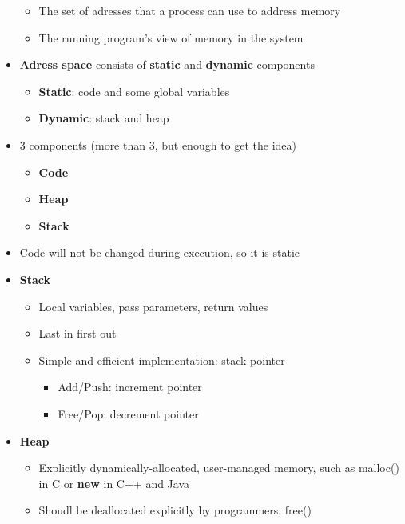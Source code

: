 \documentclass[a4paper,11pt,english]{article}
\begin{document}
\begin{itemize}
\begin{itemize}
            \item The set of adresses that a process can use to address memory
            \item The running program's view of memory in the system
        \end{itemize}
    \item \textbf{\color{blue} Adress space} consists of \textbf{\color{blue} static} and \textbf{\color{blue} dynamic} components
        \begin{itemize}
            \item \textbf{\color{blue} Static}: code and some global variables
            \item \textbf{\color{blue} Dynamic}: stack and heap
        \end{itemize}
    \item 3 components (more than 3, but enough to get the idea)
        \begin{itemize}
            \item \textbf{\color{blue} Code}
            \item \textbf{\color{blue} Heap}
            \item \textbf{\color{blue} Stack}
        \end{itemize}
    \item Code will not be changed during execution, so it is static
    \item \textbf{\color{blue} Stack}
        \begin{itemize}
            \item Local variables, pass parameters, return values
            \item Last in first out
            \item Simple and efficient implementation: stack pointer
                \begin{itemize}
                    \item Add/Push: increment pointer
                    \item Free/Pop: decrement pointer
                \end{itemize}
        \end{itemize}
    \item \textbf{\color{blue} Heap}
        \begin{itemize}
            \item Explicitly dynamically-allocated, user-managed memory, such as malloc() in C or \textbf{\color{blue} new} in C++ and Java
            \item Shoudl be deallocated explicitly by programmers, free()

\end{itemize}
\end{itemize}
\end{document}
